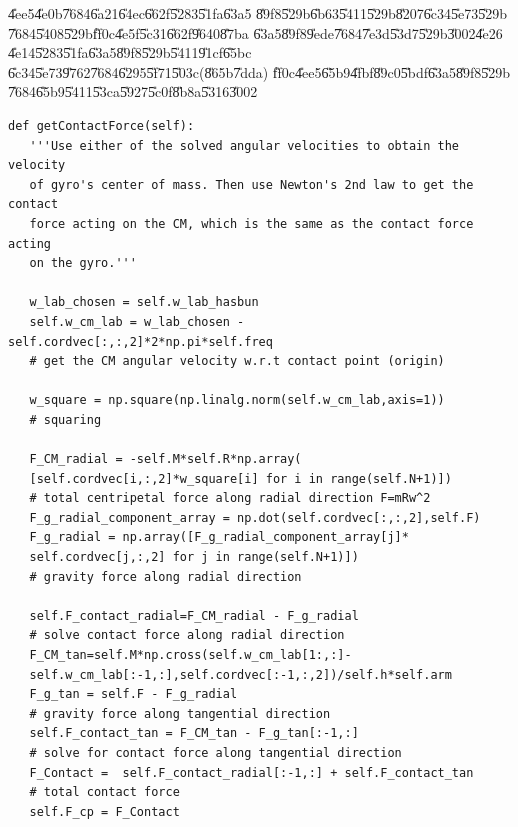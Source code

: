 \bigskip

\U{4ee5}\U{4e0b}\U{7684}\U{6a21}\U{64ec}\U{662f}\U{5283}\U{51fa}\U{63a5}%
\U{89f8}\U{529b}\U{6b63}\U{5411}\U{529b}\U{8207}\U{6c34}\U{5e73}\U{529b}%
\U{7684}\U{5408}\U{529b}\U{ff0c}\U{4e5f}\U{5c31}\U{662f}\U{9640}\U{87ba}%
\U{63a5}\U{89f8}\U{9ede}\U{7684}\U{7e3d}\U{53d7}\U{529b}\U{3002}\U{4e26}%
\U{4e14}\U{5283}\U{51fa}\U{63a5}\U{89f8}\U{529b}\U{5411}\U{91cf}\U{65bc}%
\U{6c34}\U{5e73}\U{9762}\U{7684}\U{6295}\U{5f71}\U{503c}(\U{865b}\U{7dda})%
\U{ff0c}\U{4ee5}\U{65b9}\U{4fbf}\U{89c0}\U{5bdf}\U{63a5}\U{89f8}\U{529b}%
\U{7684}\U{65b9}\U{5411}\U{53ca}\U{5927}\U{5c0f}\U{8b8a}\U{5316}\U{3002}

\bigskip

\begin{verbatim} 
def getContactForce(self):
   '''Use either of the solved angular velocities to obtain the velocity 
   of gyro's center of mass. Then use Newton's 2nd law to get the contact 
   force acting on the CM, which is the same as the contact force acting 
   on the gyro.'''

   w_lab_chosen = self.w_lab_hasbun
   self.w_cm_lab = w_lab_chosen - self.cordvec[:,:,2]*2*np.pi*self.freq
   # get the CM angular velocity w.r.t contact point (origin)
   
   w_square = np.square(np.linalg.norm(self.w_cm_lab,axis=1))
   # squaring
   
   F_CM_radial = -self.M*self.R*np.array(
   [self.cordvec[i,:,2]*w_square[i] for i in range(self.N+1)])
   # total centripetal force along radial direction F=mRw^2
   F_g_radial_component_array = np.dot(self.cordvec[:,:,2],self.F)
   F_g_radial = np.array([F_g_radial_component_array[j]*
   self.cordvec[j,:,2] for j in range(self.N+1)])
   # gravity force along radial direction 

   self.F_contact_radial=F_CM_radial - F_g_radial 
   # solve contact force along radial direction
   F_CM_tan=self.M*np.cross(self.w_cm_lab[1:,:]-
   self.w_cm_lab[:-1,:],self.cordvec[:-1,:,2])/self.h*self.arm
   F_g_tan = self.F - F_g_radial
   # gravity force along tangential direction
   self.F_contact_tan = F_CM_tan - F_g_tan[:-1,:]
   # solve for contact force along tangential direction
   F_Contact =  self.F_contact_radial[:-1,:] + self.F_contact_tan
   # total contact force
   self.F_cp = F_Contact
\end{verbatim}

\bigskip

\bigskip


